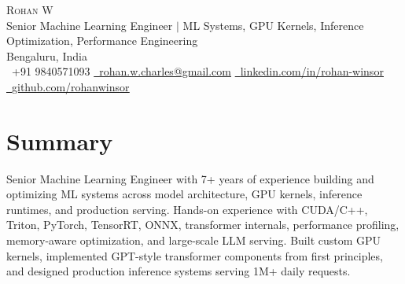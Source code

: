 \documentclass[9pt]{extarticle}
\begin{document}
\begin{center}
  {\Huge \scshape Rohan W} \\ \vspace{1pt}
  \small Senior Machine Learning Engineer $|$ ML Systems, GPU Kernels, Inference Optimization, Performance Engineering \\ \vspace{1pt}
  Bengaluru, India \\ \vspace{1pt}
  \raisebox{-0.1\height}\faPhone\ +91 9840571093
  \quad
  \href{mailto:rohan.w.charles@gmail.com}{
    \raisebox{-0.2\height}\faEnvelope\ \underline{rohan.w.charles@gmail.com}}
  \quad
  \href{https://www.linkedin.com/in/rohan-winsor/}{
    \raisebox{-0.2\height}\faLinkedin\ \underline{linkedin.com/in/rohan-winsor}}
  \quad
  \href{https://github.com/rohanwinsor}{
    \raisebox{-0.2\height}\faGithub\ \underline{github.com/rohanwinsor}}
  \vspace{-8pt}
\end{center}

\section{Summary}
\small{
Senior Machine Learning Engineer with 7+ years of experience building and optimizing ML systems across model architecture, GPU kernels, inference runtimes, and production serving. Hands-on experience with CUDA/C++, Triton, PyTorch, TensorRT, ONNX, transformer internals, performance profiling, memory-aware optimization, and large-scale LLM serving. Built custom GPU kernels, implemented GPT-style transformer components from first principles, and designed production inference systems serving 1M+ daily requests.
}
\vspace{-6pt}

\end{document}
